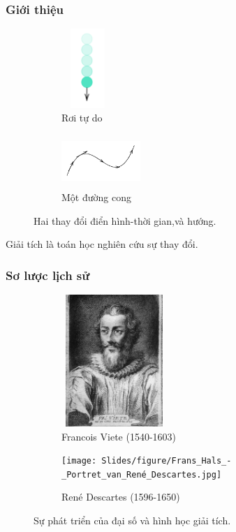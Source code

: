 \begin{frame}
\frametitle{Giới thiệu}
\begin{figure}[htbp]
    \centering
    \begin{subfigure}[t]{0.45\textwidth}
        \centering
        \includegraphics[width=2cm, height=3cm]{Slides/figure/free fall.png}
        \caption{Rơi tự do}
    \end{subfigure}
    \hfill
    \begin{subfigure}[t]{0.45\textwidth}
        \centering
        \includegraphics[width=3cm, height=2cm]{Slides/figure/curvature.png}
        \caption{Một đường cong}
    \end{subfigure}
    \caption{Hai thay đổi điển hình-thời gian,và hướng.}
\end{figure}
Giải tích là toán học nghiên cứu sự thay đổi.
\end{frame}
\begin{frame}
\frametitle{Sơ lược lịch sử}
    \begin{figure}[htbp]
    \centering
    \begin{subfigure}[t]{0.45\textwidth}
        \centering
        \includegraphics[width=4cm, height=5cm]{Slides/figure/Francois_Viete.jpeg}
        \caption{Francois Viete (1540-1603)}
    \end{subfigure}
    \hfill
    \begin{subfigure}[t]{0.45\textwidth}
        \centering
        \texttt{[image: Slides/figure/Frans\_Hals\_-\_Portret\_van\_René\_Descartes.jpg]}
        \caption{René Descartes (1596-1650)}
    \end{subfigure}
    \caption{Sự phát triển của đại số  và hình học giải tích.}
\end{figure}
\end{frame}
